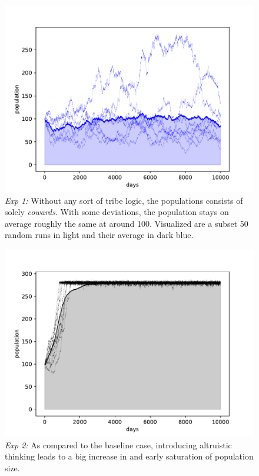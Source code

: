 \documentclass[sigconf]{acmart}
\newcommand{\VNumSimulations}{50\xspace}
\newcommand{\VNumPop}{100\xspace}
\newcommand{\cowards}{\textit{cowards}\xspace}
\begin{document}
    \pagebreak

    \begin{figure}[hbt!]
        \includegraphics[width=\columnwidth]{figures/exp1_stable_pop}
        \caption{\textit{Exp 1:} Without any sort of tribe logic, the populations consists of solely \cowards.
        With some deviations, the population stays on average roughly the same at around \VNumPop.
        Visualized are a subset \VNumSimulations random runs in light and their average in dark blue. }
        \label{fig:exp1_stable_pop}
    \end{figure}

    \begin{figure}[hbt!]
        \includegraphics[width=\columnwidth]{figures/exp2_total}
        \caption{\textit{Exp 2:} As compared to the baseline case, introducing altruistic thinking leads to a big increase in and early saturation of population size.
        }
        \label{fig:exp2_total}
    \end{figure}
\end{document}
